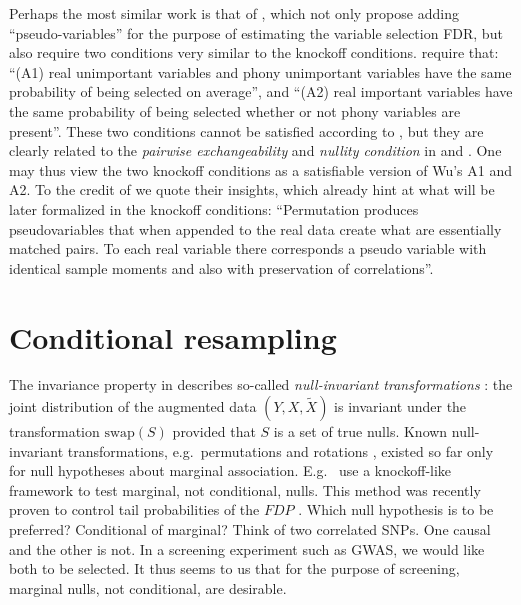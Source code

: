 \documentclass[article,lineno]{biometrika}
\begin{document}
	Perhaps the most similar work is that of \cite{WuControllingVariableSelection2007}, which not only propose adding ``pseudo-variables'' for the purpose of estimating the variable selection \rm{FDR}, but also require two conditions very similar to the knockoff conditions.
	\cite{WuControllingVariableSelection2007} require that:
	``(A1) real unimportant variables and phony unimportant variables have the same probability of being selected on average'', and
	``(A2) real important variables have the same probability of being selected whether or not phony variables are present''.
	These two conditions cannot be satisfied according to \cite{WuControllingVariableSelection2007}, but they are clearly related to the \emph{pairwise exchangeability} and \emph{nullity condition} in \cite{SesiaGenehuntinghidden} and \cite{CandesPanninggoldmodelX2018}.
	One may thus view the two knockoff conditions as a satisfiable version of Wu's A1 and A2.
	To the credit of \cite{WuControllingVariableSelection2007} we quote their insights, which already hint at what will be later formalized in the knockoff conditions:
	``Permutation produces pseudovariables that when appended to the real data create what
	are essentially matched pairs. To each real variable there corresponds a pseudo variable with identical sample moments and also with preservation of correlations''.
	
	
	
	\section{Conditional resampling}
	The invariance property in \cite{SesiaGenehuntinghidden} describes so-called \emph{null-invariant transformations} \citep{Goeman2010}:
	the joint distribution of the augmented data $(Y,X,\tilde X)$ is invariant under the transformation $\textrm{swap}(S)$ provided that $S$ is a set of true nulls.
	Known null-invariant transformations, e.g.\ permutations and rotations \citep{Langsrud2005}, existed so far only for null hypotheses about marginal association.
	E.g.\ \citet{TusherSignificanceanalysismicroarrays2001} use a knockoff-like framework to test marginal, not conditional, nulls. This method was recently proven to control tail probabilities of the $FDP$ \citep{Hemerik2018}.
	Which null hypothesis is to be preferred? Conditional of marginal?
	Think of two correlated SNPs.
	One causal and the other is not.
	In a screening experiment such as GWAS, we would like both to be selected.
	It thus seems to us that for the purpose of screening, marginal nulls, not conditional, are desirable.
	
\end{document}
